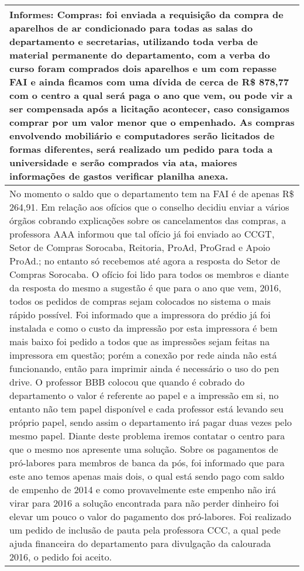 
\begin{longtable}{|p{17.5cm}|}
\hline 
Informes: Compras: foi enviada a requisição da compra de aparelhos de ar condicionado para todas as salas do departamento e secretarias, utilizando toda verba de material permanente do departamento, com a verba do curso foram comprados dois aparelhos e um com repasse FAI e ainda ficamos com uma dívida de cerca de R\$ 878,77 com o centro a qual será paga o ano que vem, ou pode vir a ser compensada após a licitação acontecer, caso consigamos comprar por um valor menor que o empenhado. As compras envolvendo mobiliário e computadores serão licitados de formas diferentes, será realizado um pedido para toda a universidade e serão comprados via ata, maiores informações de gastos verificar planilha anexa.

 \\ \hline 
No momento o saldo que o departamento tem na FAI é de apenas R\$ 264,91. Em relação aos ofícios que o conselho decidiu enviar a vários órgãos cobrando explicações sobre os cancelamentos das compras, a professora AAA informou que tal ofício já foi enviado ao CCGT, Setor de Compras Sorocaba, Reitoria, ProAd, ProGrad e Apoio ProAd.; no entanto só recebemos até agora a resposta do Setor de Compras Sorocaba. O ofício foi lido para todos os membros e diante da resposta do mesmo a sugestão é que para o ano que vem, 2016, todos os pedidos de compras sejam colocados no sistema o mais rápido possível. Foi informado que a impressora do prédio já foi instalada e como o custo da impressão por esta impressora é bem mais baixo foi pedido a todos que as impressões sejam feitas na impressora em questão; porém a conexão por rede ainda não está funcionando, então para imprimir ainda é necessário o uso do pen drive. O professor BBB colocou que quando é cobrado do departamento o valor é referente ao papel e a impressão em si, no entanto não tem papel disponível e cada professor está levando seu próprio papel, sendo assim o departamento irá pagar duas vezes pelo mesmo papel. Diante deste problema iremos contatar o centro para que o mesmo nos apresente uma solução. Sobre os pagamentos de pró-labores para membros de banca da pós, foi informado que para este ano temos apenas mais dois, o qual está sendo pago com saldo de empenho de 2014 e como provavelmente este empenho não irá virar para 2016 a solução encontrada para não perder dinheiro foi elevar um pouco o valor do pagamento dos pró-labores. Foi realizado um pedido de inclusão de pauta pela professora CCC, a qual pede ajuda financeira do departamento para divulgação da calourada 2016, o pedido foi aceito. 


\end{longtable}

